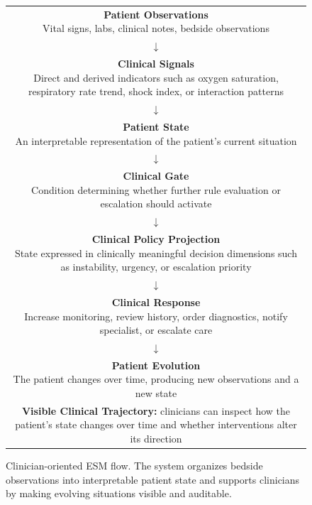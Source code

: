 \begin{figure}[ht]
\centering
\setlength{\fboxsep}{8pt}
\renewcommand{\arraystretch}{1.35}
\begin{tabular}{c}
\fbox{\parbox{0.76\textwidth}{\centering \textbf{Patient Observations}\\Vital signs, labs, clinical notes, bedside observations}}\\
$\downarrow$\\
\fbox{\parbox{0.76\textwidth}{\centering \textbf{Clinical Signals}\\Direct and derived indicators such as oxygen saturation, respiratory rate trend, shock index, or interaction patterns}}\\
$\downarrow$\\
\fbox{\parbox{0.76\textwidth}{\centering \textbf{Patient State}\\An interpretable representation of the patient's current situation}}\\
$\downarrow$\\
\fbox{\parbox{0.76\textwidth}{\centering \textbf{Clinical Gate}\\Condition determining whether further rule evaluation or escalation should activate}}\\
$\downarrow$\\
\fbox{\parbox{0.76\textwidth}{\centering \textbf{Clinical Policy Projection}\\State expressed in clinically meaningful decision dimensions such as instability, urgency, or escalation priority}}\\
$\downarrow$\\
\fbox{\parbox{0.76\textwidth}{\centering \textbf{Clinical Response}\\Increase monitoring, review history, order diagnostics, notify specialist, or escalate care}}\\
$\downarrow$\\
\fbox{\parbox{0.76\textwidth}{\centering \textbf{Patient Evolution}\\The patient changes over time, producing new observations and a new state}}\\[0.6em]
\parbox{0.82\textwidth}{\centering \textbf{Visible Clinical Trajectory:} clinicians can inspect how the patient's state changes over time and whether interventions alter its direction}
\end{tabular}
\caption{Clinician-oriented ESM flow. The system organizes bedside observations into interpretable patient state and supports clinicians by making evolving situations visible and auditable.}
\label{fig:clinician-esm-flow}
\end{figure}